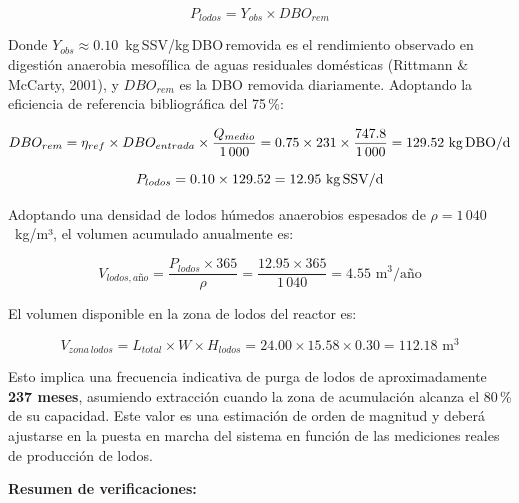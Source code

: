 \documentclass[12pt,a4paper]{article}
\begin{document}
\begin{equation}
P_{lodos} = Y_{obs} \times DBO_{rem}
\end{equation}

Donde $Y_{obs} \approx 0.10$~kg\,SSV/kg\,DBO\,removida es el rendimiento observado en digestión anaerobia mesofílica de aguas residuales domésticas (Rittmann \& McCarty, 2001), y $DBO_{rem}$ es la DBO removida diariamente. Adoptando la eficiencia de referencia bibliográfica del 75\,\%:

\begin{equation}
DBO_{rem} = \eta_{ref} \times DBO_{entrada} \times \frac{Q_{medio}}{1\,000} = 0.75 \times 231 \times \frac{747.8}{1\,000} = 129.52 \text{ kg\,DBO/d}
\end{equation}

\begin{equation}
P_{lodos} = 0.10 \times 129.52 = 12.95 \text{ kg\,SSV/d}
\end{equation}

Adoptando una densidad de lodos húmedos anaerobios espesados de $\rho = 1\,040$~kg/m³, el volumen acumulado anualmente es:

\begin{equation}
V_{lodos,año} = \frac{P_{lodos} \times 365}{\rho} = \frac{12.95 \times 365}{1\,040} = 4.55 \text{ m}^3\text{/año}
\end{equation}

El volumen disponible en la zona de lodos del reactor es:

\begin{equation}
V_{zona\,lodos} = L_{total} \times W \times H_{lodos} = 24.00 \times 15.58 \times 0.30 = 112.18 \text{ m}^3
\end{equation}

Esto implica una frecuencia indicativa de purga de lodos de aproximadamente \textbf{237 meses}, asumiendo extracción cuando la zona de acumulación alcanza el 80\,\% de su capacidad. Este valor es una estimación de orden de magnitud y deberá ajustarse en la puesta en marcha del sistema en función de las mediciones reales de producción de lodos.

\textbf{Resumen de verificaciones:}
\end{document}
